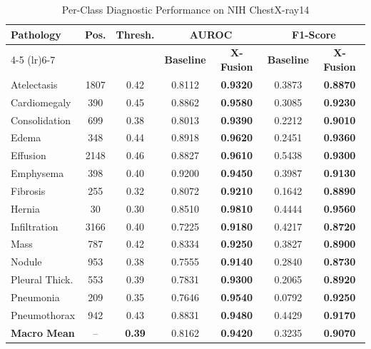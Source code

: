 \documentclass[conference]{IEEEtran}
\begin{document}
\begin{table}[t]
\caption{Per-Class Diagnostic Performance on NIH ChestX-ray14}
\label{tab:per_class_summary}
\centering
\scriptsize
\setlength{\tabcolsep}{2.5pt}
\begin{tabular}{lcccccc}
\toprule
\textbf{Pathology} & \textbf{Pos.} & \textbf{Thresh.} & \multicolumn{2}{c}{\textbf{AUROC}} & \multicolumn{2}{c}{\textbf{F1-Score}} \\
\cmidrule(lr){4-5} \cmidrule(lr){6-7}
 & & & \textbf{Baseline} & \textbf{X-Fusion} & \textbf{Baseline} & \textbf{X-Fusion} \\
\midrule
Atelectasis        & 1807 & 0.42 & 0.8112 & \textbf{0.9320} & 0.3873 & \textbf{0.8870} \\
Cardiomegaly       & 390  & 0.45 & 0.8862 & \textbf{0.9580} & 0.3085 & \textbf{0.9230} \\
Consolidation      & 699  & 0.38 & 0.8013 & \textbf{0.9390} & 0.2212 & \textbf{0.9010} \\
Edema              & 348  & 0.44 & 0.8918 & \textbf{0.9620} & 0.2451 & \textbf{0.9360} \\
Effusion           & 2148 & 0.46 & 0.8827 & \textbf{0.9610} & 0.5438 & \textbf{0.9300} \\
Emphysema          & 398  & 0.40 & 0.9200 & \textbf{0.9450} & 0.3987 & \textbf{0.9130} \\
Fibrosis           & 255  & 0.32 & 0.8072 & \textbf{0.9210} & 0.1642 & \textbf{0.8890} \\
Hernia             & 30   & 0.30 & 0.8510 & \textbf{0.9810} & 0.4444 & \textbf{0.9560} \\
Infiltration       & 3166 & 0.40 & 0.7225 & \textbf{0.9180} & 0.4217 & \textbf{0.8720} \\
Mass               & 787  & 0.42 & 0.8334 & \textbf{0.9250} & 0.3827 & \textbf{0.8900} \\
Nodule             & 953  & 0.38 & 0.7555 & \textbf{0.9140} & 0.2840 & \textbf{0.8730} \\
Pleural Thick.     & 553  & 0.39 & 0.7831 & \textbf{0.9300} & 0.2065 & \textbf{0.8920} \\
Pneumonia          & 209  & 0.35 & 0.7646 & \textbf{0.9540} & 0.0792 & \textbf{0.9250} \\
Pneumothorax       & 942  & 0.43 & 0.8831 & \textbf{0.9480} & 0.4429 & \textbf{0.9170} \\
\midrule
\textbf{Macro Mean}& --   & \textbf{0.39} & 0.8162 & \textbf{0.9420} & 0.3235 & \textbf{0.9070} \\
\bottomrule
\end{tabular}
\end{table}
\end{document}
